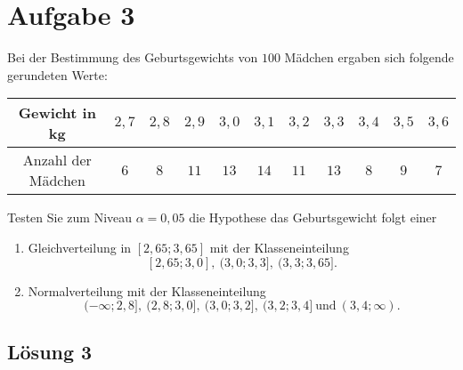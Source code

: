\documentclass[main.tex]{subfiles}
\begin{document}
\section{Aufgabe 3}
Bei der Bestimmung des Geburtsgewichts von $100$ Mädchen ergaben sich folgende gerundeten Werte:
\begin{center}
	\begin{tabular}{c|c|c|c|c|c|c|c|c|c|c}
		Gewicht in kg & $2,7$ & $2,8$ & $2,9$ & $3,0$ & $3,1$
			& $3,2$ & $3,3$ & $3,4$ & $3,5$ & $3,6$ \\ \hline
		Anzahl der Mädchen & $6$ & $8$ & $11$ & $13$ & $14$
			& $11$ & $13$ & $8$ & $9$ & $7$
	\end{tabular}
\end{center}
Testen Sie zum Niveau $\alpha = 0,05$ die Hypothese das Geburtsgewicht folgt einer
\begin{enumerate}
	\item Gleichverteilung in $[2,65; 3,65]$ mit der Klasseneinteilung $$
	[2,65; 3,0],\ (3,0; 3,3],\ (3,3; 3,65].
	$$
	\item Normalverteilung mit der Klasseneinteilung $$
	(-\infty; 2,8],\ (2,8; 3,0],\ (3,0; 3,2],\ (3,2; 3,4]\ \text{und}\ (3,4; \infty).
	$$
\end{enumerate}

\subsection{Lösung 3}
\end{document}
